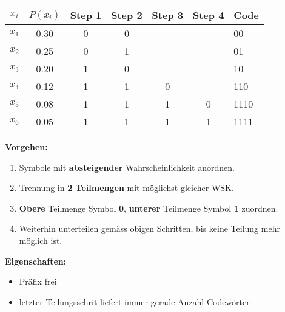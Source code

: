 \begin{multicols}{2}
	\begin{tabular}{|c|c|c|c|c|c|l|}
		\hline
		$x_i$	& $P(x_i)$ 	& Step 1	& Step 2	& Step 3 	& Step 4 	& Code \\
		\hline
		$x_1$	& 0.30		& 0			& 0			& 			&			& 00 \\
		\cline{4-4}
		$x_2$	& 0.25		& 0			& 1			& 			& 			& 01 \\
		\cline{3-4}
		$x_3$	& 0.20		& 1			& 0			& 			& 			& 10 \\
		\cline{4-5}
		$x_4$	& 0.12		& 1			& 1			& 0			& 			& 110 \\
		\cline{5-6}
		$x_5$	& 0.08		& 1			& 1			& 1			& 0			& 1110 \\
		\cline{6-6}		
		$x_6$	& 0.05		& 1			& 1			& 1			& 1			& 1111 \\
		\hline 
	\end{tabular}
	
	\columnbreak
	
	\textbf{Vorgehen:}
	\begin{enumerate}
		\item Symbole mit \textbf{absteigender} Wahrscheinlichkeit anordnen.
		\item Trennung in \textbf{2 Teilmengen} mit möglichst gleicher WSK.
		\item \textbf{Obere} Teilmenge Symbol \textbf{0}, \textbf{unterer} Teilmenge Symbol \textbf{1}
		  zuordnen.
		\item Weiterhin unterteilen gemäss obigen Schritten, bis keine Teilung mehr möglich ist.
	\end{enumerate}
	
	\textbf{Eigenschaften:}
	\begin{itemize}
  		\item Präfix frei
  		\item letzter Teilungsschrit liefert immer gerade Anzahl Codewörter 
	\end{itemize}
\end{multicols}




